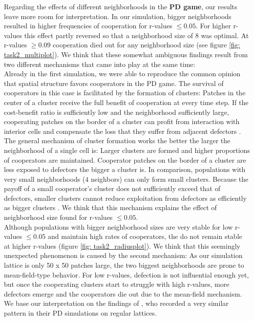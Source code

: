 \noindent Regarding the effects of different neighborhoods in the \textbf{PD game}, our results leave more room for interpretation. 
In our simulation, bigger neighborhoods resulted in higher frequencies of cooperation for r-values $\leq 0.05$. For higher r-values this effect partly reversed so that a neighborhood size of $8$ was optimal. At r-values $\geq 0.09$ cooperation died out for any neighborhood size (see figure \ref{fig: task2_multiplot}). We think that these somewhat ambiguous findings result from two different mechanisms that came into play at the same time:\\
Already in the first simulation, we were able to reproduce the common opinion that spatial structure favors cooperators in the PD game. The survival of cooperators in this case is facilitated by the formation of clusters: Patches in the center of a cluster receive the full benefit of cooperation at every time step. If the cost-benefit ratio is sufficiently low and the neighborhood sufficiently large, cooperating patches on the border of a cluster can profit from interaction with interior cells and compensate the loss that they suffer from adjacent defectors \citep{szabo2007evolutionary}.\\ 
The general mechanism of cluster formation works the better the larger the neighborhood of a single cell is: Larger clusters are formed and higher proportions of cooperators are maintained. Cooperator patches on the border of a cluster are less exposed to defectors the bigger a cluster is. In comparison, populations with very small neighborhoods ($4$ neighbors) can only form small clusters. Because the payoff of a small cooperator's cluster does not sufficiently exceed that of defectors, smaller clusters cannot reduce exploitation from defectors as efficiently as bigger clusters \citep{wang2012spatial}. We think that this mechanism explains the effect of neighborhood size found for r-values $\leq 0.05$.\\
Although populations with bigger neighborhood sizes are very stable for low r-values $\leq 0.05$ and maintain high rates of cooperators, the do not remain stable at higher r-values (figure \ref{fig: task2_radiusplot}). We think that this seemingly unexpected phenomenon is caused by the second mechanism: As our simulation lattice is only 50 x 50 patches large, the two biggest neighborhoods are prone to mean-field-type behavior. For low r-values, defection is not influential enough yet, but once the cooperating clusters start to struggle with high r-values, more defectors emerge and the cooperators die out due to the mean-field mechanism. We base our interpretation on the findings of \cite{wang2012spatial}, who recorded a very similar pattern in their PD simulations on regular lattices.




